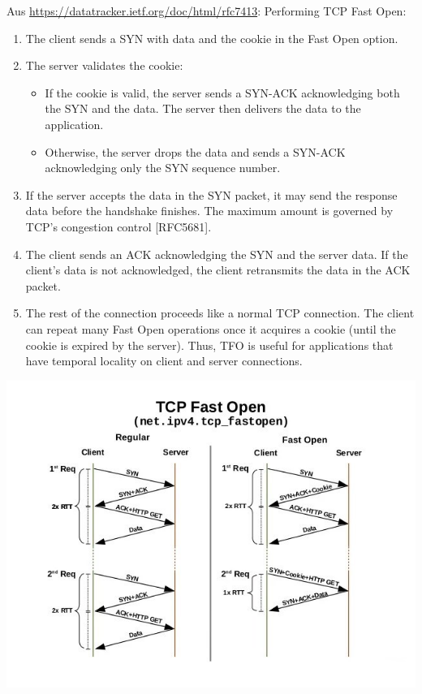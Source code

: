 \documentclass{article}
\begin{document}
	Aus \url{https://datatracker.ietf.org/doc/html/rfc7413}: Performing TCP Fast Open:
	\begin{enumerate}[label=\arabic*.]
		\item The client sends a SYN with data and the cookie in the Fast Open option.
		\item The server validates the cookie:
		\begin{itemize}
			\item If the cookie is valid, the server sends a SYN-ACK acknowledging both the SYN and the data.  The server then delivers the data to the application.
			\item Otherwise, the server drops the data and sends a SYN-ACK acknowledging only the SYN sequence number.
		\end{itemize}
		\item If the server accepts the data in the SYN packet, it may send the response data before the handshake finishes.  The maximum amount is governed by TCP's congestion control [RFC5681].
		\item The client sends an ACK acknowledging the SYN and the server data. If the client's data is not acknowledged, the client retransmits the data in the ACK packet.
		\item The rest of the connection proceeds like a normal TCP connection. The client can repeat many Fast Open operations once it acquires a cookie (until the cookie is expired by the server).  Thus, TFO is useful for applications that have temporal locality on client and server connections.
	\end{enumerate}
	\begin{center}
		\includegraphics[scale=0.6]{tcp_fast_open}
	\end{center}
	
\end{document}
